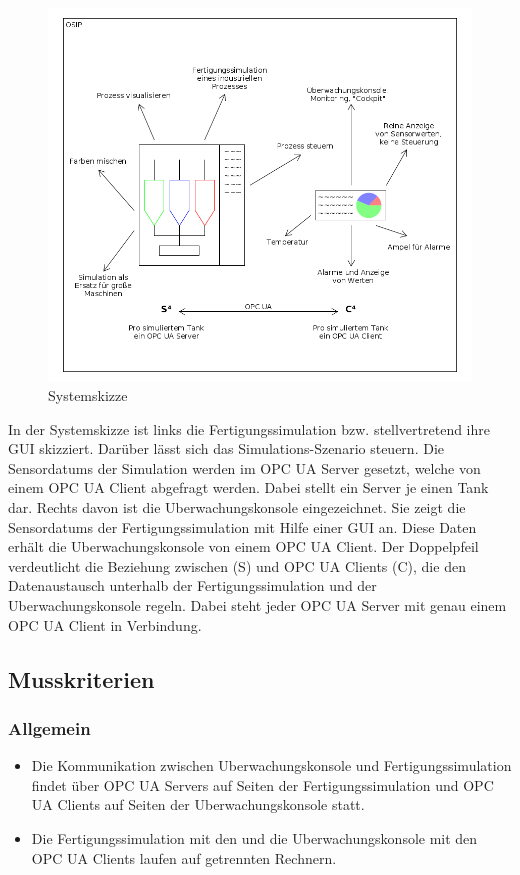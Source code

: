 \documentclass[parskip=full]{scrartcl}
\begin{document}
\begin{figure}[h!]
  \centering
  \includegraphics[scale=0.5]{../system-sketch.png}
  \caption{Systemskizze}
\end{figure}

In der Systemskizze ist links die \gls{Fertigungssimulation} bzw. stellvertretend ihre \gls{GUI} skizziert.
Darüber lässt sich das \gls{Simulations-Szenario} steuern. Die \glspl{Sensordatum} der Simulation werden 
im \gls{OPC UA Server} gesetzt, welche von einem \gls{OPC UA Client} abgefragt werden. 
Dabei stellt ein Server je einen Tank dar. Rechts davon ist die \gls{Uberwachungskonsole} eingezeichnet.
Sie zeigt die \glspl{Sensordatum} der \gls{Fertigungssimulation} mit Hilfe einer \gls{GUI} an. 
Diese Daten erhält die \gls{Uberwachungskonsole} von einem \gls{OPC UA Client}. 
Der Doppelpfeil verdeutlicht die Beziehung zwischen  (S) und
\glspl{OPC UA Client} (C), die den Datenaustausch unterhalb der \gls{Fertigungssimulation} und
der \gls{Uberwachungskonsole} regeln.
Dabei steht jeder \gls{OPC UA Server} mit genau einem {OPC UA Client} in Verbindung.

\subsection{Musskriterien}
\subsubsection{Allgemein}
\begin{itemize}
  \item Die Kommunikation zwischen \gls{Uberwachungskonsole} und \gls{Fertigungssimulation} findet \"uber \glspl{OPC UA Server} auf Seiten der \gls{Fertigungssimulation}
    und \glspl{OPC UA Client} auf Seiten der \gls{Uberwachungskonsole} statt.
  \item Die \gls{Fertigungssimulation} mit den  und die \gls{Uberwachungskonsole} mit den \glspl{OPC UA Client} laufen auf getrennten Rechnern.
\end{itemize}
\end{document}
